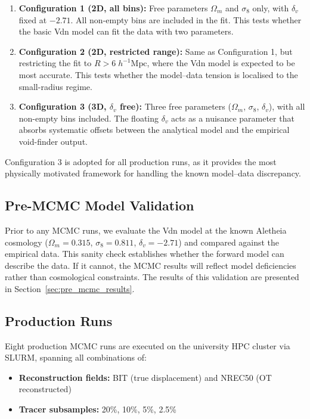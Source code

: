 \documentclass[12pt]{report}
\begin{document}
\begin{enumerate}
    \item \textbf{Configuration 1 (2D, all bins):} Free parameters $\Omega_m$ and $\sigma_8$ only, with $\delta_v$ fixed at $-2.71$. All non-empty bins are included in the fit. This tests whether the basic Vdn model can fit the data with two parameters.

    \item \textbf{Configuration 2 (2D, restricted range):} Same as Configuration 1, but restricting the fit to $R > 6\;h^{-1}\mathrm{Mpc}$, where the Vdn model is expected to be most accurate. This tests whether the model--data tension is localised to the small-radius regime.

    \item \textbf{Configuration 3 (3D, $\delta_v$ free):} Three free parameters ($\Omega_m$, $\sigma_8$, $\delta_v$), with all non-empty bins included. The floating $\delta_v$ acts as a nuisance parameter that absorbs systematic offsets between the analytical model and the empirical void-finder output.
\end{enumerate}

Configuration 3 is adopted for all production runs, as it provides the most physically motivated framework for handling the known model--data discrepancy.

\subsection{Pre-MCMC Model Validation}
\label{sec:pre_mcmc_validation}

Prior to any MCMC runs, we evaluate the Vdn model at the known Aletheia cosmology ($\Omega_m = 0.315$, $\sigma_8 = 0.811$, $\delta_v = -2.71$) and compared against the empirical data. This sanity check establishes whether the forward model can describe the data. If it cannot, the MCMC results will reflect model deficiencies rather than cosmological constraints. The results of this validation are presented in Section~\ref{sec:pre_mcmc_results}.

\subsection{Production Runs}

Eight production MCMC runs are executed on the university HPC cluster via SLURM, spanning all combinations of:
\begin{itemize}
    \item \textbf{Reconstruction fields:} BIT (true displacement) and NREC50 (OT reconstructed)
    \item \textbf{Tracer subsamples:} 20\%, 10\%, 5\%, 2.5\%
\end{itemize}
\end{document}
